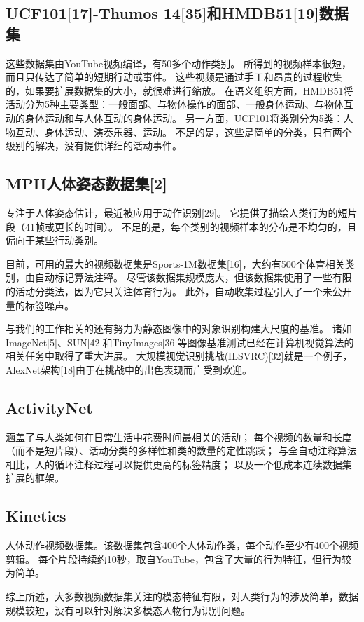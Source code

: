 \subsection{UCF101[17]-Thumos 14[35]和HMDB51[19]数据集}
这些数据集由YouTube视频编译，有50多个动作类别。
所得到的视频样本很短，而且只传达了简单的短期行动或事件。
这些视频是通过手工和昂贵的过程收集的，如果要扩展数据集的大小，就很难进行缩放。
在语义组织方面，HMDB51将活动分为5种主要类型：一般面部、与物体操作的面部、一般身体运动、与物体互动的身体运动和与人体互动的身体运动。
另一方面，UCF101将类别分为5类：人物互动、身体运动、演奏乐器、运动。
不足的是，这些是简单的分类，只有两个级别的解决，没有提供详细的活动事件。

\subsection{MPII人体姿态数据集[2]}
专注于人体姿态估计，最近被应用于动作识别[29]。
它提供了描绘人类行为的短片段（41帧或更长的时间）。
不足的是，每个类别的视频样本的分布是不均匀的，且偏向于某些行动类别。

目前，可用的最大的视频数据集是Sports-1M数据集[16]，大约有500个体育相关类别，由自动标记算法注释。
尽管该数据集规模庞大，但该数据集使用了一些有限的活动分类法，因为它只关注体育行为。
此外，自动收集过程引入了一个未公开量的标签噪声。

与我们的工作相关的还有努力为静态图像中的对象识别构建大尺度的基准。
诸如ImageNet[5]、SUN[42]和TinyImages[36]等图像基准测试已经在计算机视觉算法的相关任务中取得了重大进展。
大规模视觉识别挑战(ILSVRC)[32]就是一个例子，AlexNet架构[18]由于在挑战中的出色表现而广受到欢迎。

\subsection{ActivityNet}
涵盖了与人类如何在日常生活中花费时间最相关的活动；
每个视频的数量和长度（而不是短片段）、活动分类的多样性和类的数量的定性跳跃；
与全自动注释算法相比，人的循环注释过程可以提供更高的标签精度；
以及一个低成本连续数据集扩展的框架。

\subsection{Kinetics} 人体动作视频数据集。该数据集包含400个人体动作类，每个动作至少有400个视频剪辑。
每个片段持续约10秒，取自YouTube，包含了大量的行为特征，但行为较为简单。

综上所述，大多数视频数据集关注的模态特征有限，对人类行为的涉及简单，数据规模较短，没有可以针对解决多模态人物行为识别问题。


